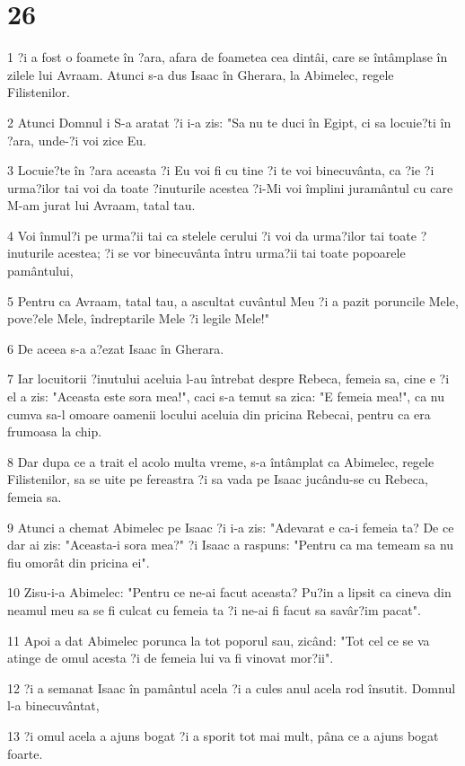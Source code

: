 \chapter{26}

\par 1 ?i a fost o foamete în ?ara, afara de foametea cea dintâi, care se întâmplase în zilele lui Avraam. Atunci s-a dus Isaac în Gherara, la Abimelec, regele Filistenilor.
\par 2 Atunci Domnul i S-a aratat ?i i-a zis: "Sa nu te duci în Egipt, ci sa locuie?ti în ?ara, unde-?i voi zice Eu.
\par 3 Locuie?te în ?ara aceasta ?i Eu voi fi cu tine ?i te voi binecuvânta, ca ?ie ?i urma?ilor tai voi da toate ?inuturile acestea ?i-Mi voi împlini juramântul cu care M-am jurat lui Avraam, tatal tau.
\par 4 Voi înmul?i pe urma?ii tai ca stelele cerului ?i voi da urma?ilor tai toate ?inuturile acestea; ?i se vor binecuvânta întru urma?ii tai toate popoarele pamântului,
\par 5 Pentru ca Avraam, tatal tau, a ascultat cuvântul Meu ?i a pazit poruncile Mele, pove?ele Mele, îndreptarile Mele ?i legile Mele!"
\par 6 De aceea s-a a?ezat Isaac în Gherara.
\par 7 Iar locuitorii ?inutului aceluia l-au întrebat despre Rebeca, femeia sa, cine e ?i el a zis: "Aceasta este sora mea!", caci s-a temut sa zica: "E femeia mea!", ca nu cumva sa-l omoare oamenii locului aceluia din pricina Rebecai, pentru ca era frumoasa la chip.
\par 8 Dar dupa ce a trait el acolo multa vreme, s-a întâmplat ca Abimelec, regele Filistenilor, sa se uite pe fereastra ?i sa vada pe Isaac jucându-se cu Rebeca, femeia sa.
\par 9 Atunci a chemat Abimelec pe Isaac ?i i-a zis: "Adevarat e ca-i femeia ta? De ce dar ai zis: "Aceasta-i sora mea?" ?i Isaac a raspuns: "Pentru ca ma temeam sa nu fiu omorât din pricina ei".
\par 10 Zisu-i-a Abimelec: "Pentru ce ne-ai facut aceasta? Pu?in a lipsit ca cineva din neamul meu sa se fi culcat cu femeia ta ?i ne-ai fi facut sa savâr?im pacat".
\par 11 Apoi a dat Abimelec porunca la tot poporul sau, zicând: "Tot cel ce se va atinge de omul acesta ?i de femeia lui va fi vinovat mor?ii".
\par 12 ?i a semanat Isaac în pamântul acela ?i a cules anul acela rod însutit. Domnul l-a binecuvântat,
\par 13 ?i omul acela a ajuns bogat ?i a sporit tot mai mult, pâna ce a ajuns bogat foarte.
